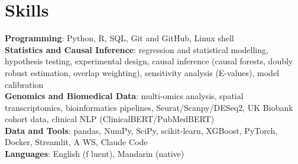 \documentclass[letterpaper,11pt]{article}
\begin{document}
\section{\textbf{Skills}}
 \begin{itemize}[leftmargin=0.15in, label={}]
    \small{\item{
     \textbf{Programming}{: Python, R, SQL, Git and GitHub, Linux shell} \\
     \textbf{Statistics and Causal Inference}{: regression and statistical modelling, hypothesis testing, experimental design, causal inference (causal forests, doubly robust estimation, overlap weighting), sensitivity analysis (E-values), model calibration} \\
     \textbf{Genomics and Biomedical Data}{: multi-omics analysis, spatial transcriptomics, bioinformatics pipelines, Seurat/Scanpy/DESeq2, UK Biobank cohort data, clinical NLP (ClinicalBERT/PubMedBERT)} \\
     \textbf{Data and Tools}{: pandas, NumPy, SciPy, scikit-learn, XGBoost, PyTorch, Docker, Streamlit, A\kern0pt WS, Claude Code} \\
     \textbf{Languages}{: English (f\kern0pt luent), Mandarin (native)}}}

 \end{itemize}
\end{document}
